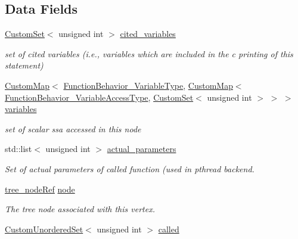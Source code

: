 \subsection*{Data Fields}
\begin{DoxyCompactItemize}
\item 
\hyperlink{custom__set_8hpp_a615bc2f42fc38a4bb1790d12c759e86f}{Custom\+Set}$<$ unsigned int $>$ \hyperlink{structOpNodeInfo_af4643b1d75b6daa18efdecdc7d01c03a}{cited\+\_\+variables}
\begin{DoxyCompactList}\small\item\em set of cited variables (i.\+e., variables which are included in the c printing of this statement) \end{DoxyCompactList}\item 
\hyperlink{custom__map_8hpp_a18ca01763abbe3e5623223bfe5aaac6b}{Custom\+Map}$<$ \hyperlink{function__behavior_8hpp_aff0ab7827d49a7aca1f277e0ff126755}{Function\+Behavior\+\_\+\+Variable\+Type}, \hyperlink{custom__map_8hpp_a18ca01763abbe3e5623223bfe5aaac6b}{Custom\+Map}$<$ \hyperlink{function__behavior_8hpp_a68c28bfcfefbe63cece191e941af0409}{Function\+Behavior\+\_\+\+Variable\+Access\+Type}, \hyperlink{custom__set_8hpp_a615bc2f42fc38a4bb1790d12c759e86f}{Custom\+Set}$<$ unsigned int $>$ $>$ $>$ \hyperlink{structOpNodeInfo_a5df54db9835f77f508db845c3726c639}{variables}
\begin{DoxyCompactList}\small\item\em set of scalar ssa accessed in this node \end{DoxyCompactList}\item 
std\+::list$<$ unsigned int $>$ \hyperlink{structOpNodeInfo_aea9c21705c836eb3960ab8df56215d8e}{actual\+\_\+parameters}
\begin{DoxyCompactList}\small\item\em Set of actual parameters of called function (used in pthread backend. \end{DoxyCompactList}\item 
\hyperlink{tree__node_8hpp_a6ee377554d1c4871ad66a337eaa67fd5}{tree\+\_\+node\+Ref} \hyperlink{structOpNodeInfo_ad4732d50b380fd617f577967b00ecd02}{node}
\begin{DoxyCompactList}\small\item\em The tree node associated with this vertex. \end{DoxyCompactList}\item 
\hyperlink{classCustomUnorderedSet}{Custom\+Unordered\+Set}$<$ unsigned int $>$ \hyperlink{structOpNodeInfo_a560909ca1b3ecdb9d2e820113acb76bc}{called}

\end{DoxyCompactItemize}
